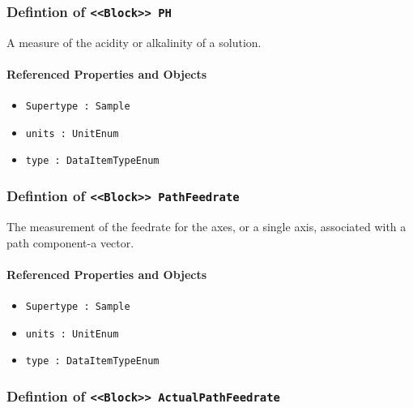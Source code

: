 \subsubsection{Defintion of \texttt{<<Block>> PH}}
  \label{type:PH}

\FloatBarrier

A measure of the acidity or alkalinity of a solution.

\FloatBarrier
\paragraph{Referenced Properties and Objects}

\begin{itemize}
\item \texttt{Supertype : Sample}

\item \texttt{units : UnitEnum}

\item \texttt{type : DataItemTypeEnum}

\end{itemize}
\FloatBarrier
\subsubsection{Defintion of \texttt{<<Block>> PathFeedrate}}
  \label{type:PathFeedrate}

\FloatBarrier

The measurement of the feedrate for the axes, or a single axis, associated with a path component-a vector.

\FloatBarrier
\paragraph{Referenced Properties and Objects}

\begin{itemize}
\item \texttt{Supertype : Sample}

\item \texttt{units : UnitEnum}

\item \texttt{type : DataItemTypeEnum}

\end{itemize}
\FloatBarrier
\subsubsection{Defintion of \texttt{<<Block>> ActualPathFeedrate}}
  \label{type:ActualPathFeedrate}

